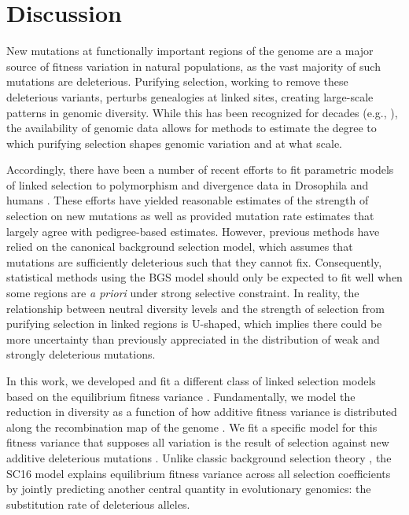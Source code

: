 \documentclass[11pt]{article}
\begin{document}
\section*{Discussion}

New mutations at functionally important regions of the genome are a major source of fitness variation in natural populations, as the vast majority of such mutations are deleterious. Purifying selection, working to remove these deleterious variants, perturbs genealogies at linked sites, creating large-scale patterns in genomic diversity. While this has been recognized for decades (e.g., \textcite{Nordborg1996-nq,Hudson1995-xc}), the availability of genomic data allows for methods to estimate the degree to which purifying selection shapes genomic variation and at what scale.

Accordingly, there have been a number of recent efforts to fit parametric models of linked selection to polymorphism and divergence data in Drosophila \parencite{Elyashiv2016-vt} and humans \parencite{McVicker2009-ax, Murphy2022-sj}. These efforts have yielded reasonable estimates of the strength of selection on new mutations as well as provided mutation rate estimates that largely agree with pedigree-based estimates. However, previous methods have relied on the canonical background selection model, which assumes that mutations are sufficiently deleterious such that they cannot fix. Consequently, statistical methods using the BGS model should only be expected to fit well when some regions are \emph{a priori} under strong selective constraint. In reality, the relationship between neutral diversity levels and the strength of selection from purifying selection in linked regions is U-shaped, which implies there could be more uncertainty than previously appreciated in the distribution of weak and strongly deleterious mutations.

In this work, we developed and fit a different class of linked selection models based on the equilibrium fitness variance \parencite{Santiago1998-bs,Santiago2016-mu}. Fundamentally, we model the reduction in diversity as a 
function of how additive fitness variance is distributed along the recombination map of the genome \parencite{Santiago1998-bs}. We fit a specific model for this fitness variance that supposes all 
variation is the result of selection against new additive deleterious mutations \parencite{Santiago2016-mu}. 
Unlike classic background selection theory \parencite{Charlesworth1993-gb,Nordborg1996-nq,Hudson1995-pt,Hudson1995-xc}, 
the SC16 model explains equilibrium fitness variance across all selection coefficients by jointly predicting another central quantity in evolutionary genomics: the 
substitution rate of deleterious alleles.
\end{document}
